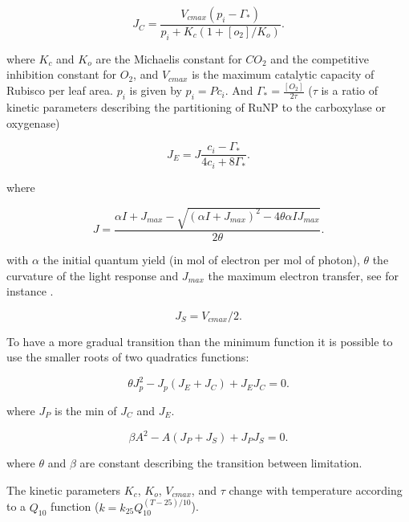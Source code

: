 \documentclass[a4paper,11pt]{article}
\begin{document}
\begin{equation}
\label{eq:JC}
J_C= \frac{V_{cmax} (p_i - \Gamma_*)}{p_i + K_c (1+[o_2]/K_o)}.
\end{equation}

where $K_c$ and $K_o$ are the Michaelis constant for $CO_2$ and the competitive inhibition constant for $O_2$, and $V_{cmax}$ is the maximum catalytic capacity of Rubisco per leaf area.
$p_i$ is given by $p_i = P c_i$. And $\Gamma_* = \frac{[O_2]}{2\tau}$ ($\tau$ is a ratio of kinetic parameters describing the partitioning of RuNP to the carboxylase or oxygenase)

\begin{equation}
\label{eq:JCb}
J_E = J \frac{ c_i - \Gamma_*}{4c_i + 8 \Gamma_*}.
\end{equation}

where

\begin{equation}
\label{eq:Jlight}
J = \frac{ \alpha I + J_{max} - \sqrt{(\alpha I + J_{max})^2 - 4 \theta \alpha I J_{max}}}{2\theta}.
\end{equation}

with $\alpha$ the initial quantum yield (in mol of electron per mol of photon), $\theta$ the curvature of the light response and $J_{max}$ the maximum electron transfer,
see for instance \citet{Bernacchi-2009}.


\begin{equation}
\label{eq:JS}
J_S= V_{cmax}/2.
\end{equation}

To have a more gradual transition than the minimum function it is possible to use the smaller roots of two quadratics functions:

\begin{equation}
\label{eq:Q1}
\theta J_p^2 - J_p(J_E+J_C) + J_E J_C= 0.
\end{equation}

where $J_P$ is the min of $J_C$ and $J_E$.

\begin{equation}
\label{eq:Q2}
\beta A^2 - A(J_P+J_S) + J_P J_S= 0.
\end{equation}

where $\theta$ and $\beta$ are constant describing the transition between limitation.

The kinetic parameters $K_c$, $K_o$, $V_{cmax}$, and $\tau$ change with temperature according to a $Q_{10}$ function ($k = k_{25} Q_{10}^{(T-25)/10}$).
\end{document}
